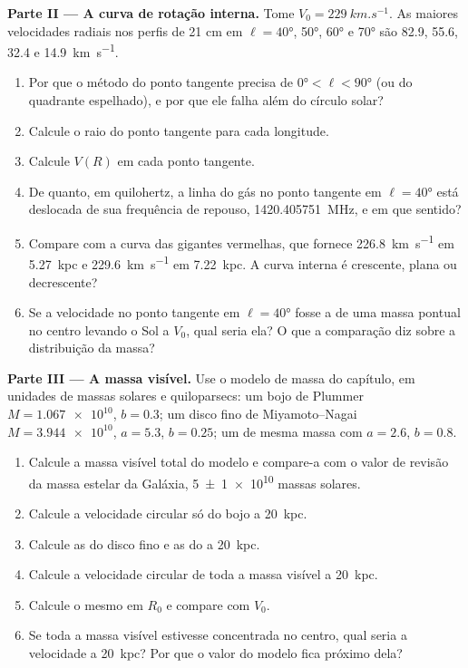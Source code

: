 \begin{problem}
\medskip\noindent\textbf{Parte II --- A curva de rotação interna.} Tome
$V_0 = \qty{229}{km.s^{-1}}$. As maiores velocidades radiais nos
perfis de 21 cm em $\ell = \ang{40}$, \ang{50}, \ang{60} e \ang{70} são
82.9, 55.6, 32.4 e \qty{14.9}{km.s^{-1}}.
\begin{enumerate}[resume]
\item Por que o método do ponto tangente precisa de $\ang{0} < \ell < \ang{90}$
  (ou do quadrante espelhado), e por que ele falha além do círculo solar?
\item Calcule o raio do ponto tangente para cada longitude.
\item Calcule $V(R)$ em cada ponto tangente.
\item De quanto, em quilohertz, a linha do gás no ponto tangente
  em $\ell = \ang{40}$ está deslocada de sua frequência de repouso,
  \qty{1420.405751}{MHz}, e em que sentido?
\item Compare com a curva das gigantes vermelhas, que fornece \qty{226.8}{km.s^{-1}}
  em \qty{5.27}{kpc} e \qty{229.6}{km.s^{-1}} em \qty{7.22}{kpc}. A
  curva interna é crescente, plana ou decrescente?
\item Se a velocidade no ponto tangente em $\ell = \ang{40}$ fosse a de
  uma massa pontual no centro levando o Sol a $V_0$, qual seria ela?
  O que a comparação diz sobre a distribuição da massa?
\end{enumerate}

\medskip\noindent\textbf{Parte III --- A massa visível.} Use o modelo de massa
do capítulo, em unidades de massas solares e quiloparsecs: um
bojo de Plummer $M = \num{1.067e10}$, $b = 0.3$; um disco fino de Miyamoto--Nagai
$M = \num{3.944e10}$, $a = 5.3$, $b = 0.25$; um  de mesma
massa com $a = 2.6$, $b = 0.8$.
\begin{enumerate}[resume]
\item Calcule a massa visível total do modelo e compare-a com o
  valor de revisão da massa estelar da Galáxia, \qty[separate-uncertainty=true]{5 \pm 1 e10}{} massas
  solares.
\item Calcule a velocidade circular só do bojo a \qty{20}{kpc}.
\item Calcule as do disco fino e as do  a \qty{20}{kpc}.
\item Calcule a velocidade circular de toda a massa visível a
  \qty{20}{kpc}.
\item Calcule o mesmo em $R_0$ e compare com $V_0$.
\item Se toda a massa visível estivesse concentrada no centro, qual seria
  a velocidade a \qty{20}{kpc}? Por que o valor do modelo fica próximo dela?
\end{enumerate}


\end{problem}
